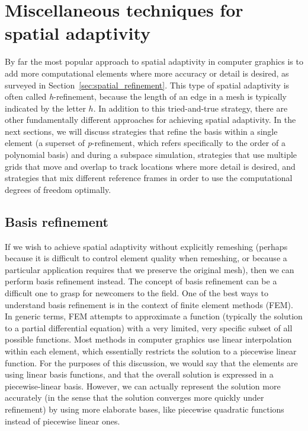 \section{Miscellaneous techniques for spatial adaptivity} \label{sec pr adaptivity}

By far the most popular approach to spatial adaptivity in computer graphics is to add more computational elements where more accuracy or detail is desired, as surveyed in Section~\ref{sec:spatial_refinement}. This type of spatial adaptivity is often called \textit{h}-refinement, because the length of an edge in a mesh is typically indicated by the letter $h$. In addition to this tried-and-true strategy, there are other fundamentally different approaches for achieving spatial adaptivity. In the next sections, we will discuss strategies that refine the basis within a single element (a superset of \textit{p}-refinement, which refers specifically to the order of a polynomial basis) and during a subspace simulation, strategies that use multiple grids that move and overlap to track locations where more detail is desired, and strategies that mix different reference frames in order to use the computational degrees of freedom optimally.

\subsection{Basis refinement}
\label{sec:basis_refinement}
If we wish to achieve spatial adaptivity without explicitly remeshing (perhaps because it is difficult to control element quality when remeshing, or because a particular application requires that we preserve the original mesh), then we can perform basis refinement instead. The concept of basis refinement can be a difficult one to grasp for newcomers to the field. One of the best ways to understand basis refinement is in the context of finite element methods (FEM). In generic terms, FEM attempts to approximate a function (typically the solution to a partial differential equation) with a very limited, very specific subset of all possible functions. Most methods in computer graphics use linear interpolation within each element, which essentially restricts the solution to a piecewise linear function. For the purposes of this discussion, we would say that the elements are using linear basis functions, and that the overall solution is expressed in a piecewise-linear basis. However, we can actually represent the solution more accurately (in the sense that the solution converges more quickly under refinement) by using more elaborate bases, like piecewise quadratic functions instead of piecewise linear ones.

